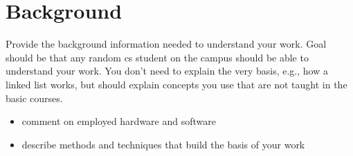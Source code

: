 \chapter{Background}
\label{sec:background}

Provide the background information needed to understand your work.
Goal should be that any random cs student on the campus should be able to understand your work.
You don't need to explain the very basis, e.g., how a linked list works, but should explain concepts you use that are not taught in the basic courses.

\begin{itemize}
    \item comment on employed hardware and software
    \item describe methods and techniques that build the basis of your work
\end{itemize}
